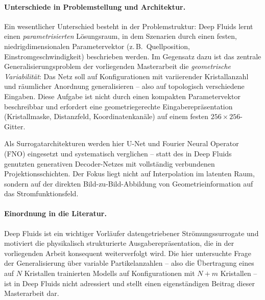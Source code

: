 \documentclass[a4paper,12pt]{article}
\begin{document}
\paragraph{Unterschiede in Problemstellung und Architektur.}
Ein wesentlicher Unterschied besteht in der Problemstruktur: Deep Fluids lernt einen
\emph{parametrisierten} Lösungsraum, in dem Szenarien durch einen festen, niedrigdimensionalen
Parametervektor (z.\,B.\ Quellposition, Einstromgeschwindigkeit) beschrieben werden.
Im Gegensatz dazu ist das zentrale Generalisierungsproblem der vorliegenden Masterarbeit
die \emph{geometrische Variabilität}: Das Netz soll auf Konfigurationen mit variierender
Kristallanzahl und räumlicher Anordnung generalisieren -- also auf topologisch verschiedene
Eingaben. Diese Aufgabe ist nicht durch einen kompakten Parametervektor beschreibbar
und erfordert eine geometriegerechte Eingaberepräsentation (Kristallmaske, Distanzfeld,
Koordinatenkanäle) auf einem festen $256 \times 256$-Gitter.

Als Surrogatarchitekturen werden hier U-Net und Fourier Neural Operator (FNO) eingesetzt
und systematisch verglichen -- statt des in Deep Fluids genutzten generativen Decoder-Netzes
mit vollständig verbundenen Projektionsschichten. Der Fokus liegt nicht auf Interpolation
im latenten Raum, sondern auf der direkten Bild-zu-Bild-Abbildung von Geometrieinformation
auf das Stromfunktionsfeld.

\paragraph{Einordnung in die Literatur.}
Deep Fluids ist ein wichtiger Vorläufer datengetriebener Strömungssurrogate und motiviert
die physikalisch strukturierte Ausgaberepräsentation, die in der vorliegenden Arbeit
konsequent weiterverfolgt wird. Die hier untersuchte Frage der Generalisierung über
variable Partikelanzahlen -- also die Übertragung eines auf $N$ Kristallen trainierten
Modells auf Konfigurationen mit $N+m$ Kristallen -- ist in Deep Fluids nicht adressiert
und stellt einen eigenständigen Beitrag dieser Masterarbeit dar.
\end{document}
